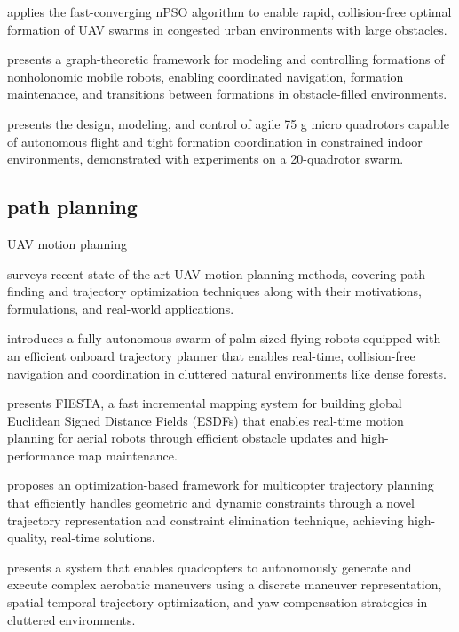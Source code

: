 \cite{spanogianopoulos2017fast} applies the fast-converging nPSO algorithm to enable rapid, collision-free optimal formation of UAV swarms in congested urban environments with large obstacles.

\cite{desai2002modeling} presents a graph-theoretic framework for modeling and controlling formations of nonholonomic mobile robots, enabling coordinated navigation, formation maintenance, and transitions between formations in obstacle-filled environments.

\cite{kushleyev2013towards} presents the design, modeling, and control of agile 75 g micro quadrotors capable of autonomous flight and tight formation coordination in constrained indoor environments, demonstrated with experiments on a 20-quadrotor swarm.


\subsection{path planning}

UAV motion planning

\cite{quan2020survey} surveys recent state-of-the-art UAV motion planning methods, covering path finding and trajectory optimization techniques along with their motivations, formulations, and real-world applications.

\cite{zhou2022swarm} introduces a fully autonomous swarm of palm-sized flying robots equipped with an efficient onboard trajectory planner that enables real-time, collision-free navigation and coordination in cluttered natural environments like dense forests.

\cite{han2019fiesta} presents FIESTA, a fast incremental mapping system for building global Euclidean Signed Distance Fields (ESDFs) that enables real-time motion planning for aerial robots through efficient obstacle updates and high-performance map maintenance.

\cite{wang2022geometrically} proposes an optimization-based framework for multicopter trajectory planning that efficiently handles geometric and dynamic constraints through a novel trajectory representation and constraint elimination technique, achieving high-quality, real-time solutions.

\cite{wang2025unlocking} presents a system that enables quadcopters to autonomously generate and execute complex aerobatic maneuvers using a discrete maneuver representation, spatial-temporal trajectory optimization, and yaw compensation strategies in cluttered environments.


